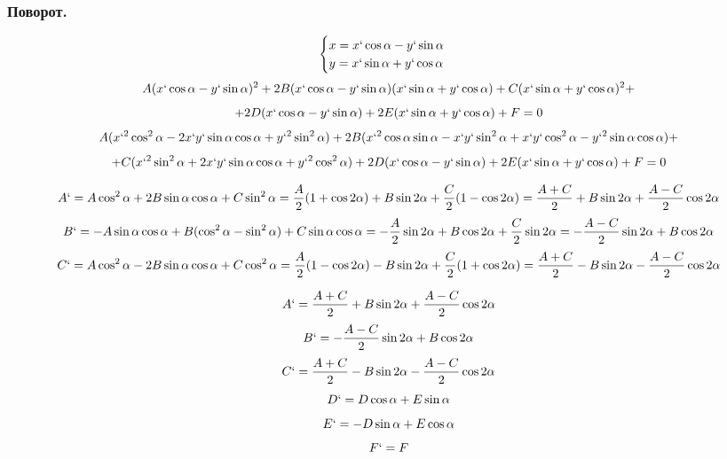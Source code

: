 \documentclass[12pt, a4paper]{article}
\begin{document}
\subsubsection{Поворот.}
\[
\begin{cases}
	x = x` \cos \alpha - y` \sin \alpha \\
	y = x` \sin \alpha + y` \cos \alpha 
\end{cases}
\]
\[ A(x` \cos \alpha - y` \sin \alpha)^2 + 2B(x` \cos \alpha - y` \sin \alpha)(x` \sin \alpha + y` \cos \alpha) +C(x` \sin \alpha + y` \cos \alpha)^2 + \]
\[+ 2D(x` \cos \alpha - y` \sin\alpha) + 2E(x` \sin \alpha + y` \cos \alpha) + F = 0\]
\[ A(x`^2 \cos^2 \alpha - 2x`y` \sin \alpha \cos \alpha + y`^2 \sin ^2 \alpha) + 2B(x`^2 \cos \alpha \sin \alpha  - x`y` \sin^2 \alpha + x` y` \cos ^2 \alpha  - y`^2 \sin \alpha \cos \alpha) +\]
\[+ C(x`^2 \sin^2 \alpha + 2x`y` \sin \alpha \cos \alpha + y`^2 \cos ^2 \alpha) + 2D(x` \cos \alpha - y` \sin \alpha ) + 2E(x` \sin \alpha + y` \cos \alpha ) + F = 0\]

\[ A` = A \cos^2 \alpha + 2B \sin \alpha \cos \alpha + C \sin ^2 \alpha = \frac{A}{2}(1 + \cos 2\alpha) + B \sin 2\alpha + \frac{C}{2}(1 - \cos 2\alpha) = \frac{A + C}{2} + B \sin 2\alpha + \frac{A - C}{2} \cos 2\alpha \]
\[ B` = -A \sin \alpha \cos \alpha + B (\cos ^2 \alpha - \sin^2 \alpha) + C \sin \alpha \cos \alpha = -\frac{A}{2}\sin 2\alpha + B \cos 2\alpha + \frac{C}{2}\sin 2\alpha = - \frac{A - C}{2} \sin 2\alpha + B \cos 2\alpha \]
\[ C` = A \cos^2 \alpha - 2B \sin \alpha \cos \alpha + C \cos ^2 \alpha = \frac{A}{2}(1 - \cos 2\alpha) - B \sin 2\alpha + \frac{C}{2}(1 + \cos 2\alpha) = \frac{A + C}{2} - B \sin 2\alpha - \frac{A - C}{2} \cos 2\alpha \]

\begin{tcolorbox}
	
\[ A` = \frac{A + C}{2} + B \sin 2\alpha + \frac{A - C}{2} \cos 2\alpha \]
\[ B` = - \frac{A - C}{2} \sin 2\alpha + B \cos 2\alpha \]
\[ C` = \frac{A + C}{2} - B \sin 2\alpha - \frac{A - C}{2} \cos 2\alpha \]
\[ D` = D\cos \alpha + E\sin \alpha \]
\[ E` = -D\sin \alpha + E\cos \alpha \]
\[ F` = F \]
\end{tcolorbox}
\end{document}
